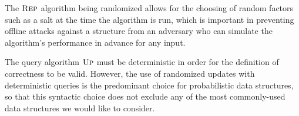 
 

The $\textsc{Rep}$ algorithm being randomized allows for the choosing of random factors such as a salt at the time the algorithm is run, which is important in preventing offline attacks against a structure from an adversary who can simulate the algorithm's performance in advance for any input.

The query algorithm $\textsc{Up}$ must be deterministic in order for the definition of correctness to be valid. However, the use of randomized updates with deterministic queries is the predominant choice for probabilistic data structures, so that this syntactic choice does not exclude any of the most commonly-used data structures we would like to consider.